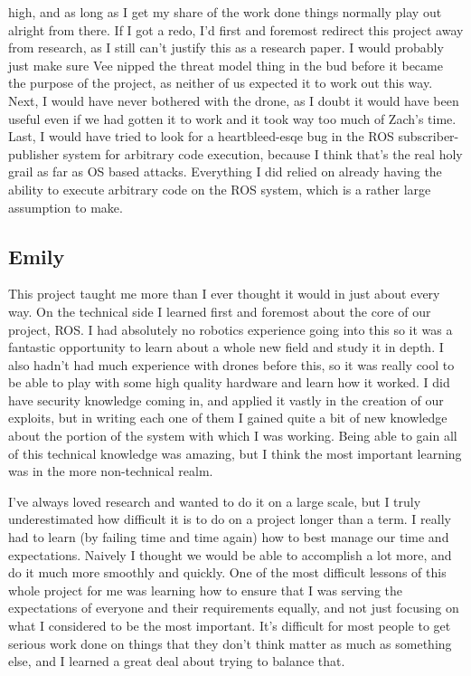 \documentclass[IEEEtran,letterpaper,10pt,notitlepage,draftclsnofoot,onecolumn]{article}
\begin{document}
high, and as long as I get my share of the work done things normally play out 
alright from there. If I got a redo, I’d first and foremost redirect this
project away from research, as I still can’t justify this as a research paper.
I would probably just make sure Vee nipped the threat model thing in the bud 
before it became the purpose of the project, as neither of us expected it to 
work out this way. Next, I would have never bothered with the drone, as I doubt 
it would have been useful even if we had gotten it to work and it took way too 
much of Zach’s time. Last, I would have tried to look for a heartbleed-esqe bug 
in the ROS subscriber-publisher system for arbitrary code execution, because I 
think that’s the real holy grail as far as OS based attacks. Everything I did 
relied on already having the ability to execute arbitrary code on the ROS 
system, which is a rather large assumption to make.

\subsection{Emily}
This project taught me more than I ever thought it would in just about every way.
On the technical side I learned first and foremost about the core of our project, ROS.
I had absolutely no robotics experience going into this so it was a fantastic opportunity to learn about a whole new field and study it in depth.
I also hadn't had much experience with drones before this, so it was really cool to be able to play with some high quality hardware and learn how it worked.
I did have security knowledge coming in, and applied it vastly in the creation of our exploits, but in writing each one of them I gained quite a bit of new knowledge about the portion of the system with which I was working.
Being able to gain all of this technical knowledge was amazing, but I think the most important learning was in the more non-technical realm.

I've always loved research and wanted to do it on a large scale, but I truly underestimated how difficult it is to do on a project longer than a term.
I really had to learn (by failing time and time again) how to best manage our time and expectations.
Naively I thought we would be able to accomplish a lot more, and do it much more smoothly and quickly.
One of the most difficult lessons of this whole project for me was learning how to ensure that I was serving the expectations of everyone and their requirements equally, and not just focusing on what I considered to be the most important.
It's difficult for most people to get serious work done on things that they don't think matter as much as something else, and I learned a great deal about trying to balance that.
\end{document}
